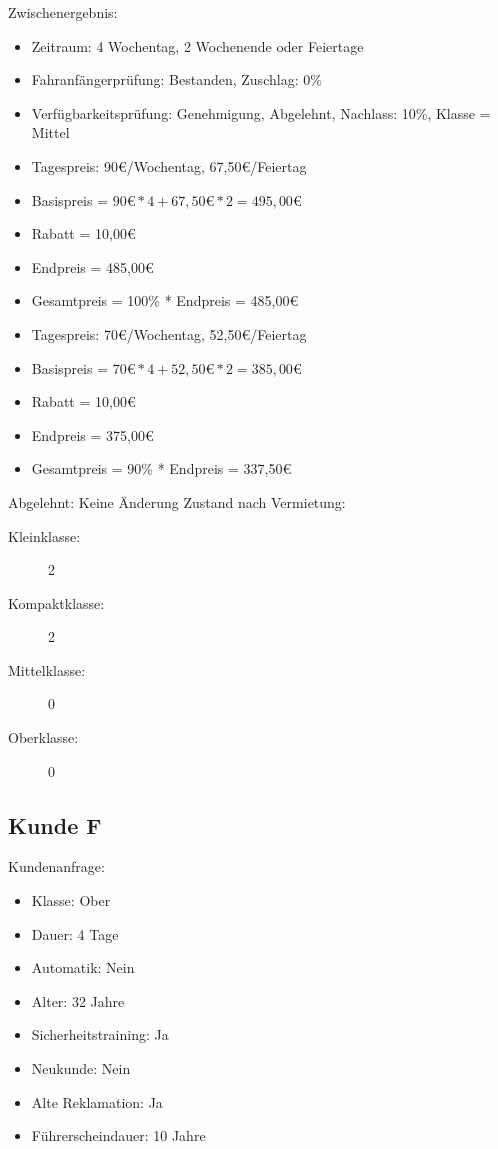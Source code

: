 Zwischenergebnis:
\begin{itemize}
	\item Zeitraum: 4 Wochentag, 2 Wochenende oder Feiertage
	\item Fahranfängerprüfung: Bestanden, Zuschlag: 0\%
	\item Verfügbarkeitsprüfung: Genehmigung, Abgelehnt, Nachlass: 10\%, Klasse = Mittel
	
	\item Tagespreis: 90€/Wochentag, 67,50€/Feiertag
	\item Basispreis = $90€ * 4 + 67,50€ * 2 = 495,00€$
	\item Rabatt = 10,00€
	\item Endpreis = 485,00€
	\item Gesamtpreis = 100\% * Endpreis = 485,00€
	
	\item Tagespreis: 70€/Wochentag, 52,50€/Feiertag
	\item Basispreis = $70€ * 4 + 52,50€ * 2 = 385,00€$
	\item Rabatt = 10,00€
	\item Endpreis = 375,00€
	\item Gesamtpreis = 90\% * Endpreis = 337,50€
\end{itemize}

Abgelehnt: Keine Änderung
Zustand nach Vermietung:
\begin{description}
	\item[Kleinklasse:] 2
	\item[Kompaktklasse:] 2
	\item[Mittelklasse:] 0
	\item[Oberklasse:] 0
\end{description}

\subsection{Kunde F}

Kundenanfrage:
\begin{itemize}
	\item Klasse: Ober
	\item Dauer: 4 Tage
	\item Automatik: Nein
	
	\item Alter: 32 Jahre
	\item Sicherheitstraining: Ja
	\item Neukunde: Nein
	\item Alte Reklamation: Ja
	\item Führerscheindauer: 10 Jahre
\end{itemize}

